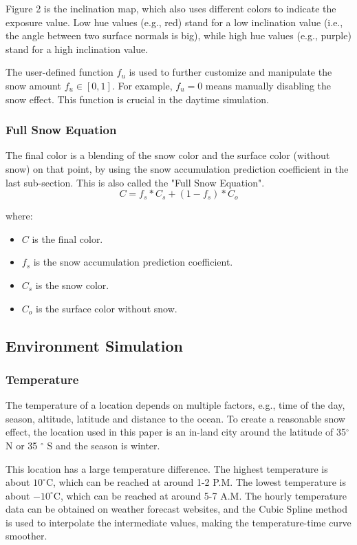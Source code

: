 \documentclass{article}
\begin{document}
Figure 2 is the inclination map, which also uses different colors to indicate the exposure value. Low hue values (e.g., red) stand for 
a low inclination value (i.e., the angle between two surface normals is big), while high hue values (e.g., purple) stand for a high 
inclination value.

The user-defined function \( f_{u} \) is used to further customize and manipulate the snow amount \( f_{u} \in [0, 1] \). For example, 
\( f_{u}=0 \) means manually disabling the snow effect. This function is crucial in the daytime simulation.

\subsubsection {Full Snow Equation}
The final color is a blending of the snow color and the surface color (without snow) on that point, by using the snow accumulation 
prediction coefficient in the last sub-section. This is also called the "Full Snow Equation".
\[
  C = f_{s} * C_{s} + (1-f_{s}) * C_{o}
\]

where:
\begin{itemize}
  \item \( C \) is the final color.
  \item \( f_{s} \) is the snow accumulation prediction coefficient.
  \item \( C_{s} \) is the snow color.
  \item \( C_{o} \) is the surface color without snow.
\end{itemize}

\subsection {Environment Simulation}

\subsubsection {Temperature}
The temperature of a location depends on multiple factors, e.g., time of the day, season, altitude, latitude and distance to the ocean. 
To create a reasonable snow effect, the location used in this paper is an in-land city around the latitude of 35$^{\circ}$ N or 35
$^{\circ}$ S and the season is winter.

This location has a large temperature difference. The highest temperature is about \(10^\circ\mathrm{C}\), which can be reached at 
around 1-2 P.M. The lowest temperature is about \(-10^\circ\mathrm{C}\), which can be reached at around 5-7 A.M. The hourly 
temperature data can be obtained on weather forecast websites, and the Cubic Spline method is used to interpolate the intermediate 
values, making the temperature-time curve smoother.
\end{document}
